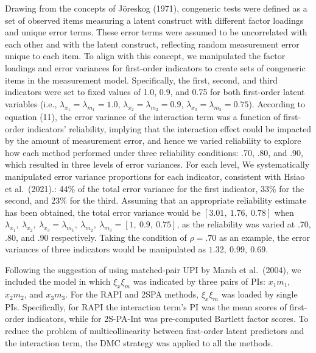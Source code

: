 \documentclass[
  man]{apa6}
\begin{document}
Drawing from the concepts of Jöreskog (1971), congeneric tests were defined as a set of observed items measuring a latent construct with different factor loadings and unique error terms. These error terms were assumed to be uncorrelated with each other and with the latent construct, reflecting random measurement error unique to each item. To align with this concept, we manipulated the factor loadings and error variances for first-order indicators to create sets of congeneric items in the measurement model. Specifically, the first, second, and third indicators were set to fixed values of 1.0, 0.9, and 0.75 for both first-order latent variables (i.e., \(\lambda_{x_{1}} = \lambda_{m_{1}} = 1.0\), \(\lambda_{x_{2}} = \lambda_{m_{2}} = 0.9\), \(\lambda_{x_{3}} = \lambda_{m_{3}} = 0.75\)). According to equation (11), the error variance of the interaction term was a function of first-order indicators' reliability, implying that the interaction effect could be impacted by the amount of measurement error, and hence we varied reliability to explore how each method performed under three reliability conditions: .70, .80, and .90, which resulted in three levels of error variances. For each level, We systematically manipulated error variance proportions for each indicator, consistent with Hsiao et al.~(2021).: 44\(\%\) of the total error variance for the first indicator, 33\(\%\) for the second, and 23\(\%\) for the third. Assuming that an appropriate reliability estimate has been obtained, the total error variance would be \([3.01, \ 1.76, \ 0.78]\) when \(\lambda_{x_{1}}, \ \lambda_{x_{2}}, \ \lambda_{x_{3}} = \lambda_{m_{1}}, \ \lambda_{m_{2}}, \ \lambda_{m_{3}} = [1, \ 0.9, \ 0.75]\), as the reliability was varied at .70, .80, and .90 respectively. Taking the condition of \(\rho = .70\) as an example, the error variances of three indicators would be manipulated as \(1.32, \ 0.99, \ 0.69\).

Following the suggestion of using matched-pair UPI by Marsh et al.~(2004), we included the model in which \(\xi_{x}\xi_{m}\) was indicated by three pairs of PIs: \(x_{1}m_{1}\), \(x_{2}m_{2}\), and \(x_{3}m_{3}\). For the RAPI and 2SPA methods, \(\xi_{x}\xi_{m}\) was loaded by single PIs. Specifically, for RAPI the interaction term's PI was the mean scores of first-order indicators, while for 2S-PA-Int was pre-computed Bartlett factor scores. To reduce the problem of multicollinearity between first-order latent predictors and the interaction term, the DMC strategy was applied to all the methods.
\end{document}

